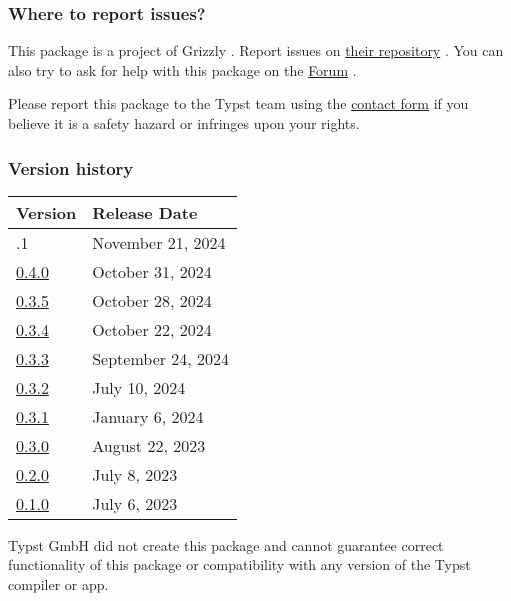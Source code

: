 \subsubsection{Where to report issues?}\label{where-to-report-issues}

This package is a project of Grizzly . Report issues on
\href{https://github.com/Grisely/packages}{their repository} . You can
also try to ask for help with this package on the
\href{https://forum.typst.app}{Forum} .

Please report this package to the Typst team using the
\href{https://typst.app/contact}{contact form} if you believe it is a
safety hazard or infringes upon your rights.

\label{versions}
\subsubsection{Version history}\label{version-history}

\begin{longtable}[]{@{}ll@{}}
\toprule\noalign{}
Version & Release Date \\
\midrule\noalign{}
\endhead
\bottomrule\noalign{}
\endlastfoot
0.4.1 & November 21, 2024 \\
\href{https://typst.app/universe/package/acrostiche/0.4.0/}{0.4.0} &
October 31, 2024 \\
\href{https://typst.app/universe/package/acrostiche/0.3.5/}{0.3.5} &
October 28, 2024 \\
\href{https://typst.app/universe/package/acrostiche/0.3.4/}{0.3.4} &
October 22, 2024 \\
\href{https://typst.app/universe/package/acrostiche/0.3.3/}{0.3.3} &
September 24, 2024 \\
\href{https://typst.app/universe/package/acrostiche/0.3.2/}{0.3.2} &
July 10, 2024 \\
\href{https://typst.app/universe/package/acrostiche/0.3.1/}{0.3.1} &
January 6, 2024 \\
\href{https://typst.app/universe/package/acrostiche/0.3.0/}{0.3.0} &
August 22, 2023 \\
\href{https://typst.app/universe/package/acrostiche/0.2.0/}{0.2.0} &
July 8, 2023 \\
\href{https://typst.app/universe/package/acrostiche/0.1.0/}{0.1.0} &
July 6, 2023 \\
\end{longtable}

Typst GmbH did not create this package and cannot guarantee correct
functionality of this package or compatibility with any version of the
Typst compiler or app.


